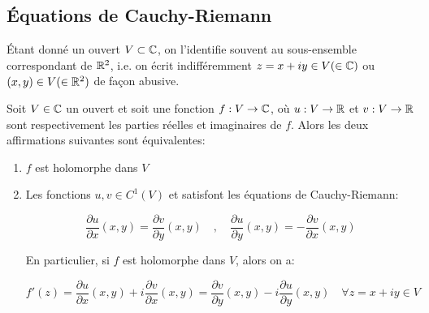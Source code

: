 \subsection{Équations de Cauchy-Riemann}

\begin{remark}
    Étant donné un ouvert $V \subset \mathbb{C}$, on l'identifie souvent au sous-ensemble correspondant de $\mathbb{R}^2$, i.e. on écrit indifféremment $z = x + iy \in V (\in \mathbb{C})$ ou $(x,y) \in V (\in \mathbb{R}^2)$ de façon abusive.
\end{remark}

\newpage

\begin{theorem}
    Soit $V \in \mathbb{C}$ un ouvert et soit une fonction $f: V \rightarrow \mathbb{C}$, où $u: V \rightarrow \mathbb{R}$ et $v: V \rightarrow \mathbb{R}$ sont respectivement les parties réelles et imaginaires de $f$.
    Alors les deux affirmations suivantes sont équivalentes:
    \begin{enumerate}[label=\arabic{enumi})]
        \item 
        $f$ est holomorphe dans $V$
        \item 
        Les fonctions $u,v \in C^1(V)$ et satisfont les équations de Cauchy-Riemann:
        
        \[
        \frac{\partial u}{\partial x}(x,y) = \frac{\partial v}{\partial y}(x,y)
        \quad,\quad
        \frac{\partial u}{\partial y}(x,y) = - \frac{\partial v}{\partial x}(x,y)
        \]
        
        En particulier, si $f$ est holomorphe dans $V$, alors on a:
        
        \[
        f'(z) = \frac{\partial u}{\partial x}(x,y) + i \frac{\partial v}{\partial x}(x,y) = \frac{\partial v}{\partial y}(x,y) - i \frac{\partial u}{\partial y}(x,y) \quad \forall z = x + iy \in V
        \]
    \end{enumerate}
\end{theorem}

